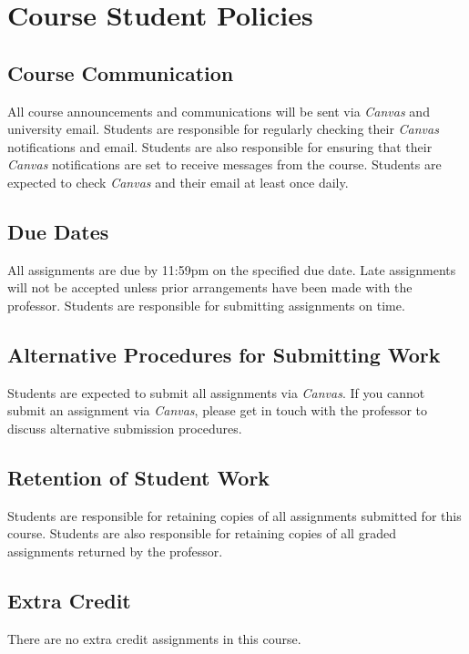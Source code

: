\documentclass[12pt, letterpaper]{article}
\begin{document}
\section*{Course Student Policies}

\subsection*{Course Communication}
All course announcements and communications will be sent via \emph{Canvas} and university email. Students are responsible for regularly checking their \emph{Canvas} notifications and email. Students are also responsible for ensuring that their \emph{Canvas} notifications are set to receive messages from the course. Students are expected to check \emph{Canvas} and their email at least once daily.

\subsection*{Due Dates}
All assignments are due by 11:59pm on the specified due date. Late assignments will not be accepted unless prior arrangements have been made with the professor. Students are responsible for submitting assignments on time.

\subsection*{Alternative Procedures for Submitting Work}
Students are expected to submit all assignments via \emph{Canvas}. If you cannot submit an assignment via \emph{Canvas}, please get in touch with the professor to discuss alternative submission procedures.

\subsection*{Retention of Student Work}
Students are responsible for retaining copies of all assignments submitted for this course. Students are also responsible for retaining copies of all graded assignments returned by the professor.

\subsection*{Extra Credit}
There are no extra credit assignments in this course. 
\end{document}
